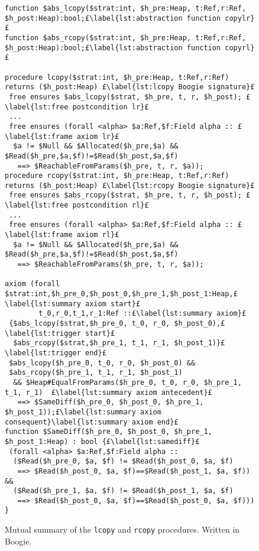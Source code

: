 \documentclass[runningheads,a4paper]{llncs}
\begin{document}
\sloppy

\begin{figure}[h!tbp]
\begin{lstlisting}[style=Boogie,firstnumber=auto,name=copyex]
function $abs_lcopy($strat:int, $h_pre:Heap, t:Ref,r:Ref, $h_post:Heap):bool;£\label{lst:abstraction function copylr}£
function $abs_rcopy($strat:int, $h_pre:Heap, t:Ref,r:Ref, $h_post:Heap):bool;£\label{lst:abstraction function copyrl}£

procedure lcopy($strat:int, $h_pre:Heap, t:Ref,r:Ref) returns ($h_post:Heap) £\label{lst:lcopy Boogie signature}£ 
 free ensures $abs_lcopy($strat, $h_pre, t, r, $h_post); £\label{lst:free postcondition lr}£ 
 ...
 free ensures (forall <alpha> $a:Ref,$f:Field alpha :: £\label{lst:frame axiom lr}£
  $a != $Null && $Allocated($h_pre,$a) && $Read($h_pre,$a,$f)!=$Read($h_post,$a,$f) 
   ==> $ReachableFromParams($h_pre, t, r, $a));
procedure rcopy($strat:int, $h_pre:Heap, t:Ref,r:Ref) returns ($h_post:Heap) £\label{lst:rcopy Boogie signature}£ 
 free ensures $abs_rcopy($strat, $h_pre, t, r, $h_post); £\label{lst:free postcondition rl}£ 
 ...
 free ensures (forall <alpha> $a:Ref,$f:Field alpha :: £\label{lst:frame axiom rl}£
  $a != $Null && $Allocated($h_pre,$a) && $Read($h_pre,$a,$f)!=$Read($h_post,$a,$f) 
   ==> $ReachableFromParams($h_pre, t, r, $a));

axiom (forall $strat:int,$h_pre_0,$h_post_0,$h_pre_1,$h_post_1:Heap,£\label{lst:summary axiom start}£
        t_0,r_0,t_1,r_1:Ref ::£\label{lst:summary axiom}£
 {$abs_lcopy($strat,$h_pre_0, t_0, r_0, $h_post_0),£\label{lst:trigger start}£
  $abs_rcopy($strat,$h_pre_1, t_1, r_1, $h_post_1)}£\label{lst:trigger end}£
 $abs_lcopy($h_pre_0, t_0, r_0, $h_post_0) && 
 $abs_rcopy($h_pre_1, t_1, r_1, $h_post_1)
  && $Heap#EqualFromParams($h_pre_0, t_0, r_0, $h_pre_1, t_1, r_1)  £\label{lst:summary axiom antecedent}£
   ==> $SameDiff($h_pre_0, $h_post_0, $h_pre_1, $h_post_1));£\label{lst:summary axiom consequent}\label{lst:summary axiom end}£
function $SameDiff($h_pre_0, $h_post_0, $h_pre_1, $h_post_1:Heap) : bool {£\label{lst:samediff}£
 (forall <alpha> $a:Ref,$f:Field alpha :: 
  ($Read($h_pre_0, $a, $f) != $Read($h_post_0, $a, $f) 
   ==> $Read($h_post_0, $a, $f)==$Read($h_post_1, $a, $f)) &&
  ($Read($h_pre_1, $a, $f) != $Read($h_post_1, $a, $f) 
   ==> $Read($h_post_0, $a, $f)==$Read($h_post_0, $a, $f))) }
\end{lstlisting}
\caption{Mutual summary of the \texttt{lcopy} and \texttt{rcopy} procedures. Written in Boogie.}\label{fig:mutual summary}
\end{figure}
\end{document}
